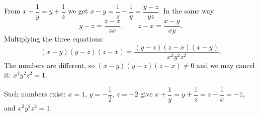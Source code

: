 From $x+\dfrac{1}{y}=y+\dfrac{1}{z}$ we get $x-y=\dfrac{1}{z}-\dfrac{1}{y}=\dfrac{y-z}{yz}$. In the same way
\[
y-z=\dfrac{z-x}{zx},\qquad z-x=\dfrac{x-y}{xy}.
\]
Multiplying the three equations:
\[
(x-y)(y-z)(z-x)=\dfrac{(y-z)(z-x)(x-y)}{x^2y^2z^2}.
\]
The numbers are different, so $(x-y)(y-z)(z-x)\ne0$ and we may cancel it: $x^2y^2z^2=\boxed{1}$.

Such numbers exist: $x=1$, $y=-\dfrac{1}{2}$, $z=-2$ give $x+\dfrac{1}{y}=y+\dfrac{1}{z}=z+\dfrac{1}{x}=-1$, and $x^2y^2z^2=1$.
